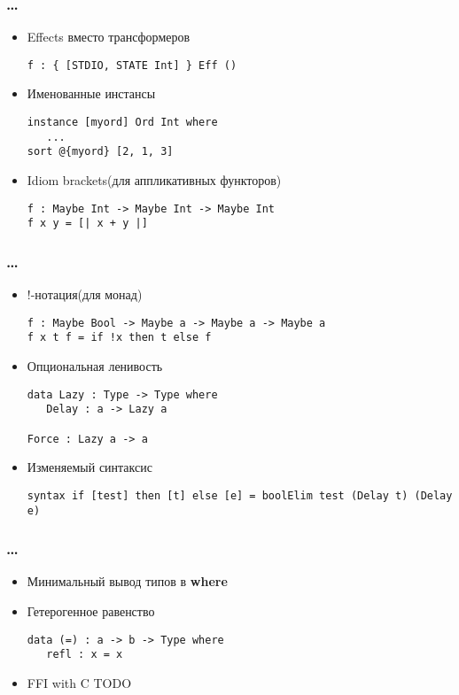 \begin{frame}[fragile]
   \frametitle{\dots}
   \begin{itemize}
   \item Effects вместо трансформеров %
         \begin{lstlisting}
f : { [STDIO, STATE Int] } Eff ()
         \end{lstlisting}
   \item Именованные инстансы
         \begin{lstlisting}
instance [myord] Ord Int where
   ...
sort @{myord} [2, 1, 3]
         \end{lstlisting}
   \item Idiom brackets(для аппликативных функторов)
         \begin{lstlisting}
f : Maybe Int -> Maybe Int -> Maybe Int
f x y = [| x + y |]
         \end{lstlisting}
   \end{itemize}
\end{frame}

\begin{frame}[fragile]
   \frametitle{\dots}
   \begin{itemize}
   \item !-нотация(для монад)
         \begin{lstlisting}
f : Maybe Bool -> Maybe a -> Maybe a -> Maybe a
f x t f = if !x then t else f
         \end{lstlisting}
   \item Опциональная ленивость
         \begin{lstlisting}
data Lazy : Type -> Type where
   Delay : a -> Lazy a

Force : Lazy a -> a
         \end{lstlisting}
   \item Изменяемый синтаксис
         \begin{lstlisting}
syntax if [test] then [t] else [e] = boolElim test (Delay t) (Delay e)
         \end{lstlisting}
   \end{itemize}
\end{frame}

\begin{frame}[fragile]
   \frametitle{\dots}
   \begin{itemize}
   \item Минимальный вывод типов в \textbf{where}
   \item Гетерогенное равенство
      \begin{lstlisting}
data (=) : a -> b -> Type where
   refl : x = x
      \end{lstlisting}
   \item FFI with C
      TODO
   \end{itemize}
\end{frame}


